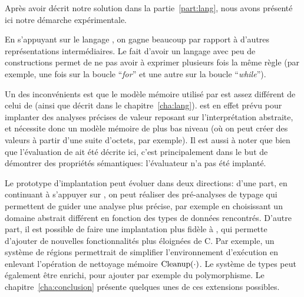 Après avoir décrit notre solution dans la partie~\ref{part:lang}, nous avons
présenté ici notre démarche expérimentale.

En s'appuyant sur le langage \newspeak, on gagne beaucoup par rapport à d'autres
représentations intermédiaires. Le fait d'avoir un langage avec peu de
constructions permet de ne pas avoir à exprimer plusieurs fois la même règle
(par exemple, une fois sur la boucle ``\emph{for}'' et une autre sur la boucle
``\emph{while}'').

Un des inconvénients est que le modèle mémoire utilisé par \newspeak est assez
différent de celui de \langname (ainsi que décrit dans le
chapitre~\ref{cha:lang}). \newspeak est en effet prévu pour implanter des
analyses précises de valeur reposant sur l'interprétation abstraite, et
nécessite donc un modèle mémoire de plus bas niveau (où on peut créer des
valeurs à partir d'une suite d'octets, par exemple). Il est aussi à noter que
bien que l'évaluation de \langname ait été décrite ici, c'est principalement
dans le but de démontrer des propriétés sémantiques: l'évaluateur n'a pas été
implanté.

Le prototype d'implantation peut évoluer dans deux directions: d'une part, en
continuant à s'appuyer sur \newspeak, on peut réaliser des pré-analyses de
typage qui permettent de guider une analyse plus précise, par exemple en
choisissant un domaine abstrait différent en fonction des types de données
rencontrés. D'autre part, il est possible de faire une implantation plus fidèle
à \langname, qui permette d'ajouter de nouvelles fonctionnalités plus éloignées
de C. Par exemple, un système de régions permettrait de simplifier
l'environnement d'exécution en enlevant l'opération de nettoyage mémoire
$\mathrm{Cleanup}(\cdot)$. Le système de types peut également être enrichi, pour ajouter
par exemple du polymorphisme. Le chapitre~\ref{cha:conclusion} présente quelques
unes de ces extensions possibles.

